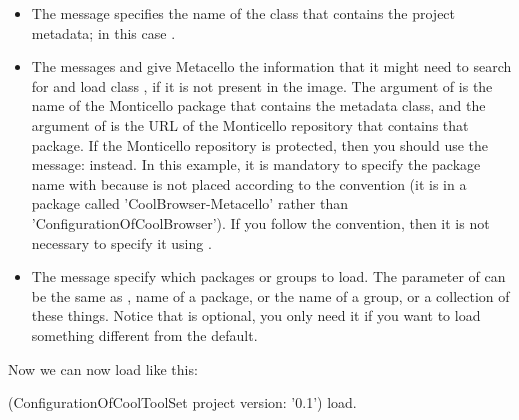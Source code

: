 \documentclass[a4paper,10pt,twoside]{book}
\begin{document}
\begin{itemize}
\item The message  specifies the name of the class that contains the project metadata; in this case .

\item The messages  and  give Metacello the information  that it might need to search for and load class , if it is not present in the image.  The argument of  is the name of the Monticello package that contains the metadata class, and the argument of  is the URL of the Monticello repository that contains that package.
If the Monticello repository is protected, then you should use the message:  instead.
In this example, it is mandatory to specify the package name with  because  is not placed according to the convention (it is in a package called 'CoolBrowser-Metacello' rather than 'ConfigurationOfCoolBrowser'). If you follow the convention, then it is not necessary to specify it using .

\item The message  specify which packages or groups to load.  The parameter of  can be the same as , \ie name of a package, or the name of a group, or a collection of these things. Notice that  is optional, you only need it if you want to load something different from the default. 


\end{itemize}

Now we can now load  like this:

\begin{code}{}
(ConfigurationOfCoolToolSet project version: '0.1') load.
\end{code}
\end{document}

